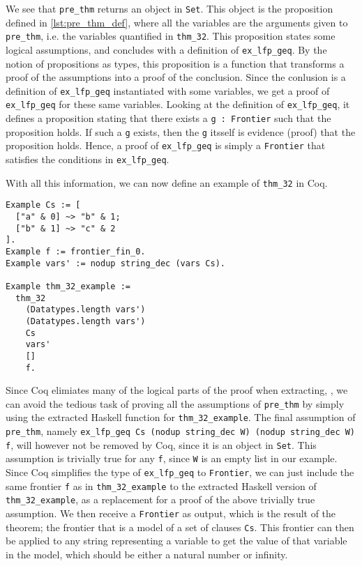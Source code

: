 We see that \lstinline{pre_thm} returns an object in \lstinline{Set}.
This object is the proposition defined in \autoref{lst:pre_thm_def},
where all the variables are the arguments given to \lstinline{pre_thm}, i.e. the variables quantified in \lstinline{thm_32}.
This proposition states some logical assumptions, and concludes with a definition of \lstinline{ex_lfp_geq}.
By the notion of propositions as types, this proposition is a function
that transforms a proof of the assumptions into a proof of the conclusion.
Since the conlusion is a definition of \lstinline{ex_lfp_geq} instantiated with some variables,
we get a proof of \lstinline{ex_lfp_geq} for these same variables.
Looking at the definition of \lstinline{ex_lfp_geq},
it defines a proposition stating that there exists a \lstinline{g : Frontier} such that the proposition holds.
If such a \lstinline{g} exists, then the \lstinline{g} itsself is evidence (proof) that the proposition holds.
Hence, a proof of \lstinline{ex_lfp_geq} is simply a \lstinline{Frontier} that satisfies the conditions in \lstinline{ex_lfp_geq}.

With all this information, we can now define an example of \lstinline{thm_32} in Coq.

\begin{minipage}{\linewidth}
\begin{lstlisting}[language=Coq, label={lst:thm_32_coq_example}, caption={\lstinline{thm_32} example}]
Example Cs := [
  ["a" & 0] ~> "b" & 1;
  ["b" & 1] ~> "c" & 2
].
Example f := frontier_fin_0.
Example vars' := nodup string_dec (vars Cs).

Example thm_32_example :=
  thm_32
    (Datatypes.length vars')
    (Datatypes.length vars')
    Cs
    vars'
    []
    f.
\end{lstlisting}
\end{minipage}

Since Coq elimiates many of the logical parts of the proof when extracting,
\cite[p. ~8]{coqextroverview},
we can avoid the tedious task of proving all the assumptions of \lstinline{pre_thm} by simply
using the extracted Haskell function for \lstinline{thm_32_example}.
The final assumption of \lstinline{pre_thm}, namely \lstinline{ex_lfp_geq Cs (nodup string_dec W) (nodup string_dec W) f},
will however not be removed by Coq, since it is an object in \lstinline{Set}.
This assumption is trivially true for any \lstinline{f}, since \lstinline{W} is an empty list in our example.
Since Coq simplifies the type of \lstinline{ex_lfp_geq} to \lstinline{Frontier},
we can just include the same frontier \lstinline{f} as in \lstinline{thm_32_example} to the extracted Haskell
version of \lstinline{thm_32_example}, as a replacement for a proof of the above trivially true assumption.
We then receive a \lstinline{Frontier} as output, which is the result of the theorem;
the frontier that is a model of a set of clauses \lstinline{Cs}.
This frontier can then be applied to any string representing a variable to get the value of that variable in the model,
which should be either a natural number or infinity.

